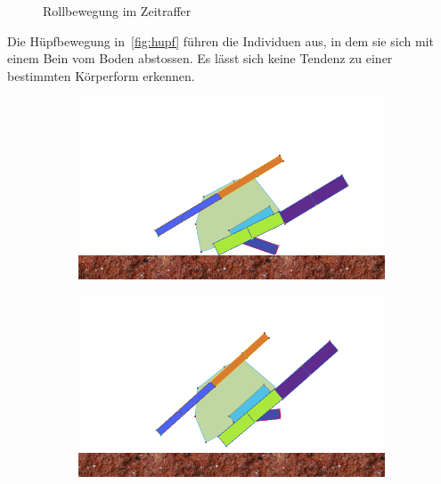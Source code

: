 \begin{figure}[H]
\begin{subfigure}[b]{0.3\textwidth}
          \caption{\label{fig:roll_6}}
        \end{subfigure}

        \caption{Rollbewegung im Zeitraffer\label{fig:roll}}

      \end{figure}

      Die Hüpfbewegung in~\vref{fig:hupf} führen die Individuen aus, in dem sie sich mit einem Bein vom Boden abstossen.
      Es lässt sich keine Tendenz zu einer bestimmten Körperform erkennen.

      \begin{figure}[H]
        \centering

        \begin{subfigure}[b]{0.3\textwidth}
          \includegraphics[width=\linewidth,center]{graphics/simulation-discussion/hupf_1}
          \caption{\label{fig:hupf_1}}
        \end{subfigure}
        \hspace{\fill}
        \begin{subfigure}[b]{0.3\textwidth}
          \includegraphics[width=\linewidth,center]{graphics/simulation-discussion/hupf_2}

\end{subfigure}
\end{figure}

